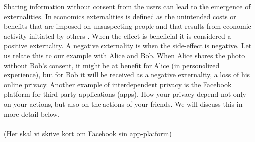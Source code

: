 Sharing information without consent from the users can lead to the emergence of externalities. In economics externalities is defined as the unintended costs or benefits that are imposed on unsuspecting people and that results from economic activity initiated by others \cite{externalityDef}. When the effect is beneficial it is considered a positive externality. A negative externality is when the side-effect is negative. Let us relate this to our example with Alice and Bob. When Alice shares the photo without Bob's consent, it might be at benefit for Alice (in personolized experience), but for Bob it will be received as a negative externality, a loss of his online privacy.  
Another example of interdependent privacy is the Facebook platform for third-party applications (apps). How your privacy depend not only on your actions, but also on the actions of your friends. We will discuss this in more detail below.   

\paragraph{}
(Her skal vi skrive kort om Facebook sin app-platform)

